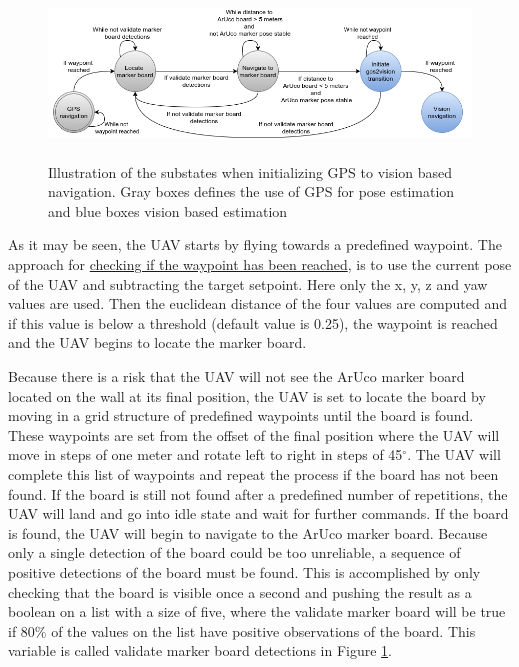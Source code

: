 \documentclass[../Head/report.tex]{subfiles}
\begin{document}
\begin{figure}[H]
    \centering
    \includegraphics[height=4.5cm]{../Figures/gps2vision_transition.png}
    \caption{Illustration of the substates when initializing GPS to vision based navigation. Gray boxes defines the use of GPS for pose estimation and blue boxes vision based estimation}
    \label{fig:state_machine_gps2vision_transition}
\end{figure}

As it may be seen, the UAV starts by flying towards a predefined waypoint. The approach for \href{https://github.com/Kenil16/master_project/blob/master/software/ros_workspace/src/offboard_control/waypoint_checking.py}{checking if the waypoint has been reached}, is to use the current pose of the UAV and subtracting the target setpoint. Here only the x, y, z and yaw values are used. Then the euclidean distance of the four values are computed and if this value is below a threshold (default value is 0.25), the waypoint is reached and the UAV begins to locate the marker board. 

Because there is a risk that the UAV will not see the ArUco marker board located on the wall at its final position, the UAV is set to locate the board by moving in a grid structure of predefined waypoints until the board is found. These waypoints are set from the offset of the final position where the UAV will move in steps of one meter and rotate left to right in steps of 45$^{\circ}$. The UAV will complete this list of waypoints and repeat the process if the board has not been found. If the board is still not found after a predefined number of repetitions, the UAV will land and go into idle state and wait for further commands. If the board 
is found, the UAV will begin to navigate to the ArUco marker board. Because only a single detection of the board could be too unreliable, a sequence of positive detections of the board must be found. This is accomplished by only checking that the board is visible once a second and pushing the result as a boolean on a list with a size of five, where the validate marker board will be true if 80\% of the values on the list have positive observations of the board. This variable is called validate marker board detections in Figure \ref{fig:state_machine_gps2vision_transition}.
\end{document}
